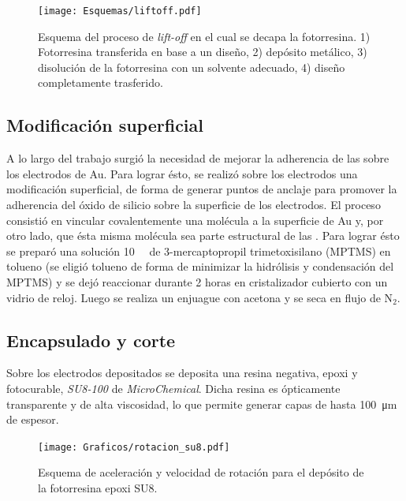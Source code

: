 		 	\begin{figure}[t!]
			  \begin{center}
			  \texttt{[image: Esquemas/liftoff.pdf]}
			  \caption[Esquema del proceso de\textit{ lift-off}]{Esquema del proceso de\textit{ lift-off} en el cual se decapa la fotorresina. 1) Fotorresina transferida en base a un diseño, 2) depósito metálico, 3) disolución de la fotorresina con un solvente adecuado, 4) diseño completamente trasferido.}
			  \label{esq:liftoff}
			  \end{center}
			  \end{figure}

	\subsection{Modificación superficial}\label{sec:silanizacion}
		
		A lo largo del trabajo surgió la necesidad de mejorar la adherencia de las \pdm\space sobre los electrodos de Au. Para lograr ésto, se realizó sobre los electrodos una modificación superficial, de forma de generar puntos de anclaje para promover la adherencia del óxido de silicio sobre la superficie de los electrodos.
		El proceso consistió en vincular covalentemente una molécula a la superficie de Au y, por otro lado, que ésta misma molécula sea parte estructural de las \pdm. Para lograr ésto se preparó una solución \SI{10}{\milli\Molar} de 3-mercaptopropil trimetoxisilano (MPTMS) en tolueno (se eligió tolueno de forma de minimizar la hidrólisis y condensación del MPTMS) y se dejó reaccionar durante 2 horas en cristalizador cubierto con un vidrio de reloj. \cite{Goss1991,Herzog2013} Luego se realiza un enjuague con acetona y se seca en flujo de N$_2$.

	\subsection{Encapsulado y corte}\label{sec:corte}

		Sobre los electrodos depositados se deposita una resina negativa, epoxi y fotocurable, \textit{SU8-100} de \textit{MicroChemical}\cite{MicrochemicalsTeam2009}. Dicha resina es ópticamente transparente y de alta viscosidad, lo que permite generar capas de hasta \SI{100}{\um} de espesor. 

		\begin{figure}[b!]
			 		  \begin{center}
			 		  \texttt{[image: Graficos/rotacion\_su8.pdf]}
			 		  \caption[Parámetros de depósito para la resina epoxi]{Esquema de aceleración y velocidad de rotación para el depósito de la fotorresina epoxi SU8.}
			 		  \label{fig:spin-su8}
			 		  \end{center}
			 		  \end{figure}

